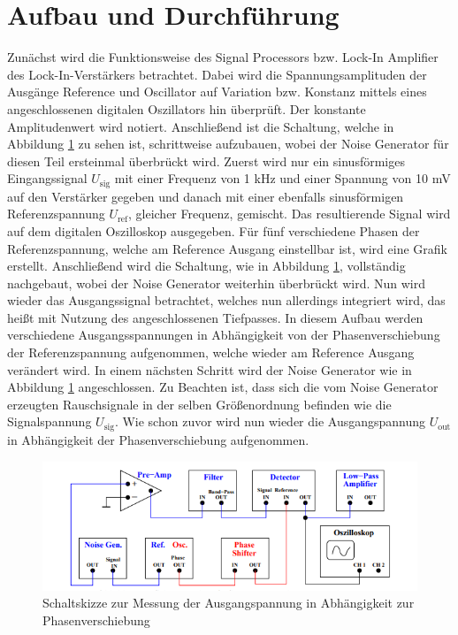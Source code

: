 \section{Aufbau und Durchführung}
\label{sec:Durchführung}
Zunächst wird die Funktionsweise des Signal Processors bzw. Lock-In Amplifier des Lock-In-Verstärkers betrachtet.
Dabei wird die Spannungsamplituden der Ausgänge Reference und Oscillator
auf Variation bzw. Konstanz mittels eines angeschlossenen digitalen Oszillators hin
überprüft. Der konstante Amplitudenwert wird notiert.
Anschließend ist die Schaltung, welche in Abbildung \ref{fig:aufbau1} zu sehen ist, schrittweise aufzubauen, wobei der Noise Generator für diesen
Teil ersteinmal überbrückt wird. Zuerst wird nur ein sinusförmiges Eingangssignal $U_\text{sig}$ mit einer Frequenz von 1 kHz und einer Spannung von 10 mV auf den
Verstärker gegeben und danach mit einer ebenfalls sinusförmigen Referenzspannung $U_\text{ref}$, gleicher Frequenz, gemischt. Das resultierende Signal wird auf dem digitalen Oszilloskop
ausgegeben. Für fünf verschiedene Phasen der Referenzspannung, welche am Reference Ausgang einstellbar ist, wird eine Grafik erstellt.
Anschließend wird die Schaltung, wie in Abbildung \ref{fig:aufbau1}, vollständig nachgebaut, wobei der Noise Generator weiterhin überbrückt wird.
Nun wird wieder das Ausgangssignal betrachtet, welches nun allerdings integriert wird, das heißt mit Nutzung des angeschlossenen Tiefpasses. In diesem Aufbau werden verschiedene Ausgangsspannungen 
in Abhängigkeit von der Phasenverschiebung der Referenzspannung aufgenommen, welche wieder am Reference Ausgang verändert wird.
In einem nächsten Schritt wird der Noise Generator wie in Abbildung \ref{fig:aufbau1} angeschlossen. Zu Beachten ist, dass sich die vom Noise Generator erzeugten Rauschsignale in der
selben Größenordnung befinden wie die Signalspannung $U_\text{sig}$. Wie schon zuvor wird nun wieder die Ausgangspannung $U_\text{out}$ in Abhängigkeit der Phasenverschiebung aufgenommen.
\begin{figure}
  \centering
  \includegraphics{content/abbildung2.png}
  \caption{Schaltskizze zur Messung der Ausgangspannung in Abhängigkeit zur Phasenverschiebung \cite[4]{V303}}
  \label{fig:aufbau1}
\end{figure}
